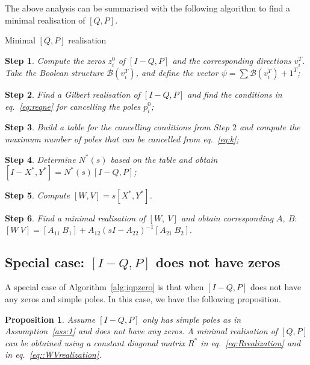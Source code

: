 \documentclass[twocolumn,12pt]{autart}
\theoremstyle{plain}
\newtheorem{proposition}{Proposition}
\newtheorem{step}{Step}
\begin{document}
The above analysis can be summarised with the following algorithm to find a minimal realisation of $[Q,P]$.
\begin{algorithm}[!]
\caption{Minimal $[Q,P]$ realisation}
\begin{step}
Compute the zeros $z^0_i$ of $[I-Q,P]$ and the corresponding directions $v_i^T$. Take the Boolean structure $\mathcal{B}(v_i^T)$, and define the vector  $\psi=\sum\mathcal{B}(v_i^T)+{1}^T$;
\end{step}
\begin{step}
Find a Gilbert realisation of $[I-Q,P]$ and find the conditions in eq.~\eqref{eq:reqne}
for cancelling the poles $p_i^0$;
\end{step}
\begin{step}
Build a table for the cancelling conditions from Step $2$ and compute the maximum 
number of poles that can be cancelled from eq.~\eqref{eq:k};
\end{step}
\begin{step}
Determine $N^*(s)$ based on the table and obtain $[I-X^*,Y^*]=N^*(s)[I-Q,P]$;
\end{step}
\begin{step}
Compute $[W,V]=s[X^*,Y^*]$.
\end{step}
\begin{step}
Find a minimal realisation of $[W,~V]$ and obtain corresponding $A,~B:$ 
$[{W}~{V}]=[{A}_{11}~{B}_1]+{A}_{12}(s{I}-{A}_{22})^{-1}[{A}_{21}~{B}_2].$
\end{step}
\label{alg:iqpzero}
\end{algorithm}

\subsection{Special case:  $[I-Q,P]$ does not have zeros}\label{sec:special}
A special case of Algorithm~\ref{alg:iqpzero} is that when $[I-Q,P]$ does not have any zeros and simple poles. In this case, we have the following proposition. 
\begin{proposition}\label{prop:d}\cite{yetac}
Assume $[{I-Q},{P}]$ only has simple poles as in Assumption~\ref{ass:1} and does not have any zeros. A minimal realisation of $[Q,P]$
can be obtained using a constant diagonal matrix ${R}^*$ in eq.~\eqref{eq:Rrealization} and in eq.~\eqref{eq::WVrealization}.\end{proposition}
\end{document}
